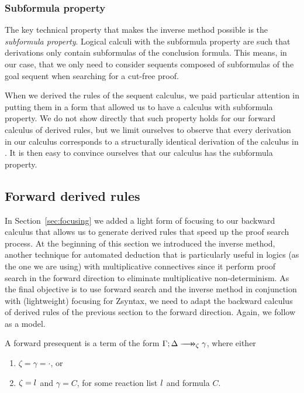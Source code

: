 \subsubsection{Subformula property}

The key technical property that makes the inverse method possible is the
\emph{subformula property}. Logical calculi with the subformula property are
such that derivations only contain subformulas of the conclusion formula. This
means, in our case, that we only need to consider sequents composed of
subformulas of the goal sequent when searching for a cut-free proof.

When we derived the rules of the sequent calculus, we paid particular attention
in putting them in a form that allowed us to have a calculus with subformula
property. We do not show directly that such property holds for our forward
calculus of derived rules, but we limit ourselves to observe that every
derivation in our calculus corresponds to a structurally identical derivation of
the calculus in \cite{chaudhuri-thesis}. It is then easy to convince ourselves
that our calculus has the subformula property.

\subsection{Forward derived rules}

In Section~\ref{sec:focusing} we added a light form of focusing to our backward
calculus that allows us to generate derived rules that speed up the proof search
process. At the beginning of this section we introduced the inverse method,
another technique for automated deduction that is particularly useful in logics
(as the one we are using) with multiplicative connectives since it perform proof
search in the forward direction to eliminate multiplicative non-determinism. As
the final objective is to use forward search and the inverse method in
conjunction with (lightweight) focusing for Zsyntax, we need to adapt the
backward calculus of derived rules of the previous section to the forward
direction. Again, we follow \cite{chaudhuri-thesis} as a model.

\begin{definition}
  A forward presequent is a term of the form
  $\zfneuseq{\Gamma}{\Delta}{\zeta}{\gamma}$, where either

  \begin{enumerate}
  \item $\zeta = \gamma = \cdot$, or
  \item $\zeta = l_{}$ and $\gamma = C$, for some reaction list
    $l_{}$ and formula $C$.
  \end{enumerate}
\end{definition}

